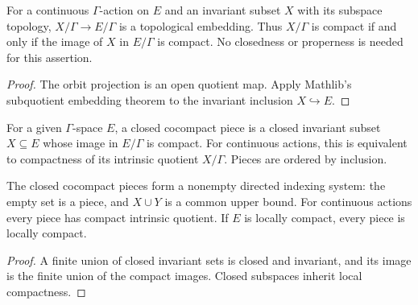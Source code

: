 \begin{proposition}\label{prop:invariant-subspace-orbit-embedding}
For a continuous $\Gamma$-action on $E$ and an invariant subset $X$ with
its subspace topology, $X/\Gamma\to E/\Gamma$ is a topological embedding.
Thus $X/\Gamma$ is compact if and only if the image of $X$ in $E/\Gamma$
is compact. No closedness or properness is needed for this assertion.
\end{proposition}
\begin{proof}
\leanok
The orbit projection is an open quotient map. Apply Mathlib's
subquotient embedding theorem to the invariant inclusion $X\hookrightarrow E$.
\end{proof}

\begin{definition}\label{def:closed-cocompact-piece}
\leanok
For a given $\Gamma$-space $E$, a closed cocompact piece is a closed
invariant subset $X\subseteq E$ whose image in $E/\Gamma$ is compact.
For continuous actions, this is equivalent to compactness of its
intrinsic quotient $X/\Gamma$. Pieces are ordered by inclusion.
\end{definition}

\begin{proposition}\label{prop:cocompact-pieces-directed}
The closed cocompact pieces form a nonempty directed indexing system:
the empty set is a piece, and $X\cup Y$ is a common upper bound.
For continuous actions every piece has compact intrinsic quotient.
If $E$ is locally compact, every piece is locally compact.
\end{proposition}
\begin{proof}
\leanok
A finite union of closed invariant sets is closed and invariant, and
its image is the finite union of the compact images. Closed subspaces
inherit local compactness.
\end{proof}

